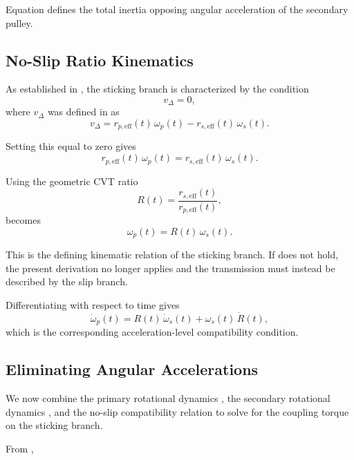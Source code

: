 \documentclass[11pt]{article}
\numberwithin{equation}{section}
\begin{document}
Equation  defines the total inertia
opposing angular acceleration of the secondary pulley.

\subsection{No-Slip Ratio Kinematics}

As established in , the sticking branch is
characterized by the condition
\[
v_{\Delta}=0,
\]
where \(v_{\Delta}\) was defined in  as
\[
v_{\Delta}
=
r_{p,\text{eff}}(t)\,\omega_p(t)
-
r_{s,\text{eff}}(t)\,\omega_s(t).
\]

Setting this equal to zero gives
\begin{equation}
r_{p,\text{eff}}(t)\,\omega_p(t)
=
r_{s,\text{eff}}(t)\,\omega_s(t).
\label{eq:no_slip_condition}
\end{equation}

Using the geometric CVT ratio
\[
R(t)
=
\frac{r_{s,\text{eff}}(t)}{r_{p,\text{eff}}(t)},
\]
 becomes
\begin{equation}
\omega_p(t)=R(t)\,\omega_s(t).
\label{eq:ratio_speed_constraint}
\end{equation}

This is the defining kinematic relation of the sticking branch.
If  does not hold, the present derivation no
longer applies and the transmission must instead be described by the slip
branch.

Differentiating  with respect to time gives
\begin{equation}
\dot{\omega}_p(t)
=
R(t)\,\dot{\omega}_s(t)
+
\omega_s(t)\,\dot R(t),
\label{eq:alpha_relation}
\end{equation}
which is the corresponding acceleration-level compatibility condition.

\subsection{Eliminating Angular Accelerations}

We now combine the primary rotational dynamics
,
the secondary rotational dynamics
,
and the no-slip compatibility relation
to solve for the coupling torque on the sticking branch.

From ,
\end{document}
